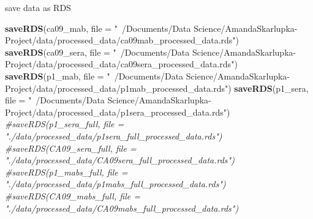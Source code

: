\documentclass[]{article}
\newenvironment{Shaded}{\begin{snugshade}}{\end{snugshade}}
\newcommand{\CommentTok}[1]{\textcolor[rgb]{0.56,0.35,0.01}{\textit{#1}}}
\newcommand{\DataTypeTok}[1]{\textcolor[rgb]{0.13,0.29,0.53}{#1}}
\newcommand{\KeywordTok}[1]{\textcolor[rgb]{0.13,0.29,0.53}{\textbf{#1}}}
\newcommand{\NormalTok}[1]{#1}
\newcommand{\StringTok}[1]{\textcolor[rgb]{0.31,0.60,0.02}{#1}}
\begin{document}
save data as RDS

\begin{Shaded}
\begin{Highlighting}[]
\KeywordTok{saveRDS}\NormalTok{(ca09_mab, }\DataTypeTok{file =} \StringTok{"~/Documents/Data Science/AmandaSkarlupka-Project/data/processed_data/ca09mab_processed_data.rds"}\NormalTok{)}
\KeywordTok{saveRDS}\NormalTok{(ca09_sera, }\DataTypeTok{file =} \StringTok{"~/Documents/Data Science/AmandaSkarlupka-Project/data/processed_data/ca09sera_processed_data.rds"}\NormalTok{)}
\KeywordTok{saveRDS}\NormalTok{(p1_mab, }\DataTypeTok{file =} \StringTok{"~/Documents/Data Science/AmandaSkarlupka-Project/data/processed_data/p1mab_processed_data.rds"}\NormalTok{)}
\KeywordTok{saveRDS}\NormalTok{(p1_sera, }\DataTypeTok{file =} \StringTok{"~/Documents/Data Science/AmandaSkarlupka-Project/data/processed_data/p1sera_processed_data.rds"}\NormalTok{)}
\CommentTok{#saveRDS(p1_sera_full, file = "./data/processed_data/p1sera_full_processed_data.rds")}
\CommentTok{#saveRDS(CA09_sera_full, file = "./data/processed_data/CA09sera_full_processed_data.rds")}
\CommentTok{#saveRDS(p1_mabs_full, file = "./data/processed_data/p1mabs_full_processed_data.rds")}
\CommentTok{#saveRDS(CA09_mabs_full, file = "./data/processed_data/CA09mabs_full_processed_data.rds")}
\end{Highlighting}
\end{Shaded}
\end{document}

